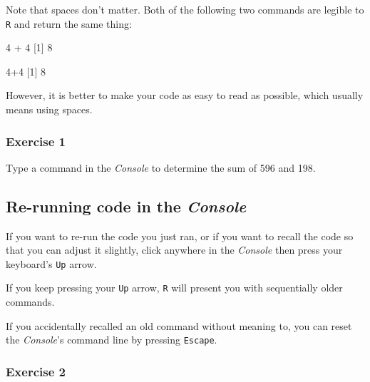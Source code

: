 \documentclass[
]{book}
\newenvironment{Shaded}{\begin{snugshade}}{\end{snugshade}}
\newcommand{\DecValTok}[1]{\textcolor[rgb]{0.00,0.00,0.81}{#1}}
\newcommand{\NormalTok}[1]{#1}
\newcommand{\SpecialCharTok}[1]{\textcolor[rgb]{0.00,0.00,0.00}{#1}}
\begin{document}
Note that spaces don't matter. Both of the following two commands are legible to \texttt{R} and return the same thing:

\begin{Shaded}
\begin{Highlighting}[]
\DecValTok{4} \SpecialCharTok{+} \DecValTok{4}
\NormalTok{[}\DecValTok{1}\NormalTok{] }\DecValTok{8}

\DecValTok{4}\SpecialCharTok{+}\DecValTok{4}
\NormalTok{[}\DecValTok{1}\NormalTok{] }\DecValTok{8}
\end{Highlighting}
\end{Shaded}

However, it is better to make your code as easy to read as possible, which usually means using spaces.

\hypertarget{exercise-1}{%
\subsubsection*{Exercise 1}\label{exercise-1}}

Type a command in the \emph{Console} to determine the sum of 596 and 198.

\hypertarget{re-running-code-in-the-console}{%
\subsection*{\texorpdfstring{Re-running code in the \emph{Console}}{Re-running code in the Console}}\label{re-running-code-in-the-console}}

If you want to re-run the code you just ran, or if you want to recall the code so that you can adjust it slightly, click anywhere in the \emph{Console} then press your keyboard's \texttt{Up} arrow.

If you keep pressing your \texttt{Up} arrow, \texttt{R} will present you with sequentially older commands.

If you accidentally recalled an old command without meaning to, you can reset the \emph{Console}'s command line by pressing \texttt{Escape}.

\hypertarget{exercise-2}{%
\subsubsection*{Exercise 2}\label{exercise-2}}
\end{document}
